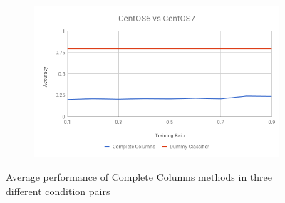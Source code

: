\documentclass[10pt, conference, compsocconf]{IEEEtran}
\begin{document}
\begin{figure}[h!]
\begin{subfigure}[b]{0.8\linewidth}
                \includegraphics[width=\columnwidth]{figures/ALS/columns-ALS-6vs7-PFS}
        \end{subfigure}
        \caption{Average performance of Complete Columns methods in three different condition pairs}
        \label{fig:columns method}
\end{figure}
\end{document}
